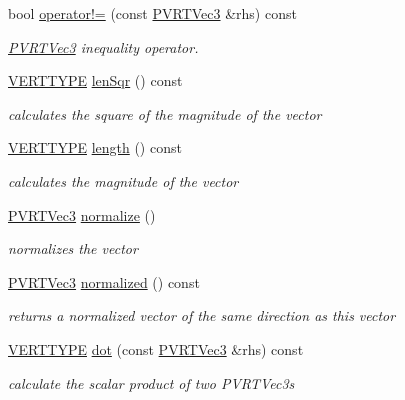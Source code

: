 \begin{DoxyCompactItemize}
bool \hyperlink{struct_p_v_r_t_vec3_abfae38bf849e2ff9274462da7739b125}{operator!=} (const \hyperlink{struct_p_v_r_t_vec3}{P\+V\+R\+T\+Vec3} \&rhs) const 
\begin{DoxyCompactList}\small\item\em \hyperlink{struct_p_v_r_t_vec3}{P\+V\+R\+T\+Vec3} inequality operator. \end{DoxyCompactList}\item 
\hyperlink{group___a_p_i___o_g_l_e_s_ga06da457b7d3e93368ab904f89e1396be}{V\+E\+R\+T\+T\+Y\+P\+E} \hyperlink{struct_p_v_r_t_vec3_a047a44ed1a92ee6079785bc73dd4dbb6}{len\+Sqr} () const 
\begin{DoxyCompactList}\small\item\em calculates the square of the magnitude of the vector \end{DoxyCompactList}\item 
\hyperlink{group___a_p_i___o_g_l_e_s_ga06da457b7d3e93368ab904f89e1396be}{V\+E\+R\+T\+T\+Y\+P\+E} \hyperlink{struct_p_v_r_t_vec3_aa2c1f573d504ea9ebe52d112cfd91222}{length} () const 
\begin{DoxyCompactList}\small\item\em calculates the magnitude of the vector \end{DoxyCompactList}\item 
\hyperlink{struct_p_v_r_t_vec3}{P\+V\+R\+T\+Vec3} \hyperlink{struct_p_v_r_t_vec3_a18fbcf5025ed7c64bb00ba27f94302a4}{normalize} ()
\begin{DoxyCompactList}\small\item\em normalizes the vector \end{DoxyCompactList}\item 
\hyperlink{struct_p_v_r_t_vec3}{P\+V\+R\+T\+Vec3} \hyperlink{struct_p_v_r_t_vec3_ac5c54e180c246587037d2f7fa2c4d12d}{normalized} () const 
\begin{DoxyCompactList}\small\item\em returns a normalized vector of the same direction as this vector \end{DoxyCompactList}\item 
\hyperlink{group___a_p_i___o_g_l_e_s_ga06da457b7d3e93368ab904f89e1396be}{V\+E\+R\+T\+T\+Y\+P\+E} \hyperlink{struct_p_v_r_t_vec3_af9156c21175c3f3b04fb11295f336623}{dot} (const \hyperlink{struct_p_v_r_t_vec3}{P\+V\+R\+T\+Vec3} \&rhs) const 
\begin{DoxyCompactList}\small\item\em calculate the scalar product of two P\+V\+R\+T\+Vec3s \end{DoxyCompactList}\item 

\end{DoxyCompactItemize}
